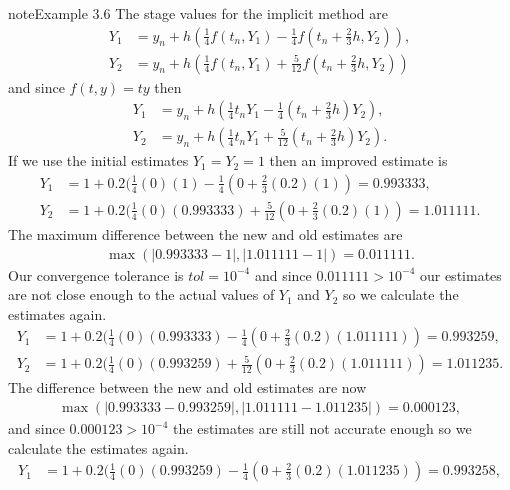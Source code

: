 \documentclass[letterpaper,10pt,english]{jupyterBook}
\begin{document}
\begin{sphinxadmonition}{note}{Example 3.6}
\sphinxAtStartPar
The stage values for the implicit method are
\begin{align*}
    Y_1 &= y_n + h(\tfrac{1}{4} f(t_n, Y_1) - \tfrac{1}{4} f(t_n + \tfrac{2}{3}h, Y_2)), \\
    Y_2 &= y_n + h(\tfrac{1}{4} f(t_n, Y_1) + \tfrac{5}{12} f(t_n + \tfrac{2}{3}h, Y_2))
\end{align*}
\sphinxAtStartPar
and since \(f(t, y) = ty\) then
\begin{align*}
    Y_1 &= y_n + h(\tfrac{1}{4} t_n Y_1 - \tfrac{1}{4} (t_n + \tfrac{2}{3}h) Y_2), \\
    Y_2 &= y_n + h(\tfrac{1}{4} t_n Y_1 + \tfrac{5}{12} (t_n + \tfrac{2}{3}h) Y_2).
\end{align*}
\sphinxAtStartPar
If we use the initial estimates \(Y_1 = Y_2 = 1\) then an improved estimate is
\begin{align*}
    Y_1 &= 1 + 0.2(\tfrac{1}{4} (0)(1) - \tfrac{1}{4} (0 + \tfrac{2}{3}(0.2)(1)) = 0.993333, \\
    Y_2 &= 1 + 0.2(\tfrac{1}{4} (0)(0.993333) + \tfrac{5}{12} (0 + \tfrac{2}{3}(0.2)(1)) = 1.011111.
\end{align*}
\sphinxAtStartPar
The maximum difference between the new and old estimates are
\begin{align*}
    \max(|0.993333 - 1|, |1.011111 - 1|) = 0.011111.
\end{align*}
\sphinxAtStartPar
Our convergence tolerance is \(tol=10^{-4}\) and since \(0.011111 > 10^{-4}\) our estimates are not close enough to the actual values of \(Y_1\) and \(Y_2\) so we calculate the estimates again.
\begin{align*}
    Y_1 &= 1 + 0.2(\tfrac{1}{4} (0)(0.993333) - \tfrac{1}{4} (0 + \tfrac{2}{3}(0.2)(1.011111)) = 0.993259, \\
    Y_2 &= 1 + 0.2(\tfrac{1}{4} (0)(0.993259) + \tfrac{5}{12} (0 + \tfrac{2}{3}(0.2)(1.011111)) = 1.011235.
\end{align*}
\sphinxAtStartPar
The difference between the new and old estimates are now
\begin{align*}
    \max(|0.993333 - 0.993259|, |1.011111 - 1.011235|) = 0.000123,
\end{align*}
\sphinxAtStartPar
and since \(0.000123 > 10^{-4}\) the estimates are still not accurate enough so we calculate the estimates again.
\begin{align*}
    Y_1 &= 1 + 0.2(\tfrac{1}{4} (0)(0.993259) - \tfrac{1}{4} (0 + \tfrac{2}{3}(0.2)(1.011235)) = 0.993258, \\

\end{align*}
\end{sphinxadmonition}
\end{document}

